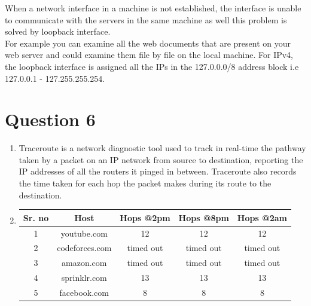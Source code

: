 \documentclass[a4paper,11pt]{article}
\begin{document}
\begin{enumerate}[itemsep=-3pt,label=(\alph*)]
	When a network interface in a machine is not established, the interface is unable to communicate with the servers in the same machine as well this problem is solved by loopback interface.\\For example you can examine all the web documents that are present on your web server and could examine them file by file on the local machine. For IPv4, the loopback interface is assigned all the IPs in the 127.0.0.0/8 address block i.e 127.0.0.1 - 127.255.255.254.
	
	
\end{enumerate}

\section*{Question 6}
\begin{enumerate}[itemsep=-3pt,label=(\alph*)]
	\item Traceroute is a network diagnostic tool used to track in real-time the pathway taken by a packet on an IP network from source to destination, reporting the IP addresses of all the routers it pinged in between. Traceroute also records the time taken for each hop the packet makes during its route to the destination.
	\item \begin{tabular}{|c|c|c|c|c|}
		\hline
		\rowcolor[RGB]{0, 145, 255}
		\textbf{Sr. no}&\textbf{Host} &\textbf{ Hops @2pm } & \textbf { Hops @8pm }\hspace{0.1mm} & \textbf{ Hops @2am }\\
		\hline
		
			\rowcolor[RGB]{230, 242, 255}
		1&youtube.com & 12 & 12 & 12
		\\ \hline
		
		 \rowcolor[RGB]{0, 247, 255}
		2&codeforces.com & timed out& timed out &timed out 
		\\ \hline
		
			\rowcolor[RGB]{230, 242, 255}
		3&amazon.com & timed out & timed out & timed out 
		\\ \hline
		
			\rowcolor[RGB]{0, 247, 255}
		4&sprinklr.com & 13 & 13 &13
		\\ \hline
		
			\rowcolor[RGB]{230, 242, 255}
		5&facebook.com & 8 & 8 & 8
		\\ \hline
		

\end{tabular}
\end{enumerate}
\end{document}
